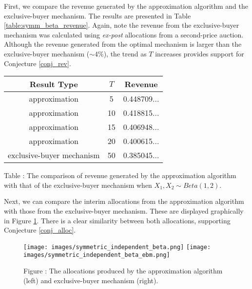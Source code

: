 First, we compare the revenue generated by the approximation algorithm and the exclusive-buyer mechanism. The results are presented in Table \ref{table:symm_beta_revenue}. Again, note the revenue from the exclusive-buyer mechanism was calculated using \textit{ex-post} allocations from a second-price auction. Although the revenue generated from the optimal mechanism is larger than the exclusive-buyer mechanism ($\sim$4\%), the trend as $T$ increases provides support for Conjecture \ref{conj_rev}.

\begin{center}
    \begin{tabular}{ |c|c|c| } 
    \hline
    Result Type & $T$ & Revenue \\
    \hline
    \hline
    approximation & 5 & 0.448709... \\ 
    approximation & 10 & 0.418815... \\ 
    approximation & 15 & 0.406948... \\ 
    approximation & 20 & 0.400615... \\ 
    exclusive-buyer mechanism & 50 & 0.385045... \\
    \hline
    \end{tabular}

    \vspace{1mm}
    \raggedright{\small {\sc Table \thefig\label{table:symm_beta_revenue}:} The comparison of revenue generated by the approximation algorithm with that of the exclusive-buyer mechanism when $X_1,X_2 \sim Beta(1,2)$.}
\end{center}

Next, we can compare the interim allocations from the approximation algorithm with those from the exclusive-buyer mechanism. These are displayed graphically in Figure \ref{fig:beta12_alloc}. There is a clear similarity between both allocations, supporting Conjecture \ref{conj_alloc}.

\begin{figure}[H]
    \begin{center}
    \texttt{[image: images/symmetric\_independent\_beta.png]}
    \texttt{[image: images/symmetric\_independent\_beta\_ebm.png]}
    \end{center}
    
    \vspace{1mm}
    \raggedright{\small {\sc Figure \thefig\label{fig:beta12_alloc}:} The allocations produced by the approximation algorithm (left) and exclusive-buyer mechanism (right).} 
\end{figure}



